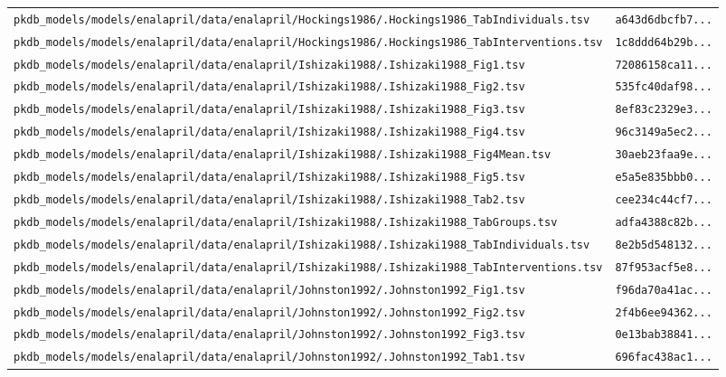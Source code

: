 \begin{longtable}{ll}
\texttt{pkdb\_models/models/enalapril/data/enalapril/Hockings1986/.Hockings1986\_TabIndividuals.tsv} & \texttt{a643d6dbcfb7...} \\
\texttt{pkdb\_models/models/enalapril/data/enalapril/Hockings1986/.Hockings1986\_TabInterventions.tsv} & \texttt{1c8ddd64b29b...} \\
\texttt{pkdb\_models/models/enalapril/data/enalapril/Ishizaki1988/.Ishizaki1988\_Fig1.tsv} & \texttt{72086158ca11...} \\
\texttt{pkdb\_models/models/enalapril/data/enalapril/Ishizaki1988/.Ishizaki1988\_Fig2.tsv} & \texttt{535fc40daf98...} \\
\texttt{pkdb\_models/models/enalapril/data/enalapril/Ishizaki1988/.Ishizaki1988\_Fig3.tsv} & \texttt{8ef83c2329e3...} \\
\texttt{pkdb\_models/models/enalapril/data/enalapril/Ishizaki1988/.Ishizaki1988\_Fig4.tsv} & \texttt{96c3149a5ec2...} \\
\texttt{pkdb\_models/models/enalapril/data/enalapril/Ishizaki1988/.Ishizaki1988\_Fig4Mean.tsv} & \texttt{30aeb23faa9e...} \\
\texttt{pkdb\_models/models/enalapril/data/enalapril/Ishizaki1988/.Ishizaki1988\_Fig5.tsv} & \texttt{e5a5e835bbb0...} \\
\texttt{pkdb\_models/models/enalapril/data/enalapril/Ishizaki1988/.Ishizaki1988\_Tab2.tsv} & \texttt{cee234c44cf7...} \\
\texttt{pkdb\_models/models/enalapril/data/enalapril/Ishizaki1988/.Ishizaki1988\_TabGroups.tsv} & \texttt{adfa4388c82b...} \\
\texttt{pkdb\_models/models/enalapril/data/enalapril/Ishizaki1988/.Ishizaki1988\_TabIndividuals.tsv} & \texttt{8e2b5d548132...} \\
\texttt{pkdb\_models/models/enalapril/data/enalapril/Ishizaki1988/.Ishizaki1988\_TabInterventions.tsv} & \texttt{87f953acf5e8...} \\
\texttt{pkdb\_models/models/enalapril/data/enalapril/Johnston1992/.Johnston1992\_Fig1.tsv} & \texttt{f96da70a41ac...} \\
\texttt{pkdb\_models/models/enalapril/data/enalapril/Johnston1992/.Johnston1992\_Fig2.tsv} & \texttt{2f4b6ee94362...} \\
\texttt{pkdb\_models/models/enalapril/data/enalapril/Johnston1992/.Johnston1992\_Fig3.tsv} & \texttt{0e13bab38841...} \\
\texttt{pkdb\_models/models/enalapril/data/enalapril/Johnston1992/.Johnston1992\_Tab1.tsv} & \texttt{696fac438ac1...} \\

\end{longtable}
